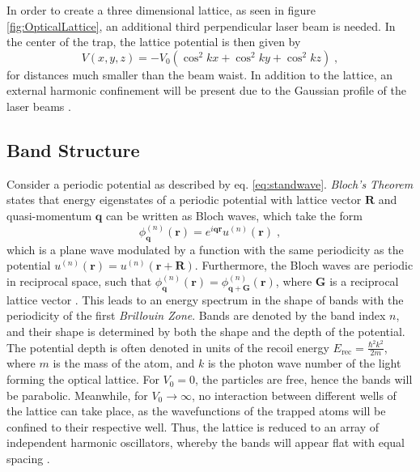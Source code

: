 In order to create a three dimensional lattice, as seen in figure \ref{fig:OpticalLattice}, an additional third perpendicular laser beam is needed. In the center of the trap, the lattice potential is then given by
\begin{equation}
	V(x,y,z) = - V_0 \left( \cos^2{k x } + \cos^2{k y } + \cos^2{k z } \right) \; , \label{eq:3Dlattice}
\end{equation}
for distances much smaller than the beam waist. In addition to the lattice, an external harmonic confinement will be present due to the Gaussian profile of the laser beams \cite{manybodyBloch}.

\subsection{Band Structure}
Consider a periodic potential as described by eq. \eqref{eq:standwave}. \textit{Bloch's Theorem} states that energy eigenstates of a periodic potential with lattice vector $\boldsymbol{R}$ and quasi-momentum $\boldsymbol{q}$ can be written as Bloch waves, which take the form
\begin{equation}
	\phi_{\boldsymbol{q}}^{(n)}(\boldsymbol{r}) = e^{i \boldsymbol{q} \boldsymbol{r}} u^{(n)}(\boldsymbol{r}) \; ,
\end{equation}
which is a plane wave modulated by a function with the same periodicity as the potential $u^{(n)}(\boldsymbol{r}) = u^{(n)}(\boldsymbol{r} + \boldsymbol{R})$. Furthermore, the Bloch waves are periodic in reciprocal space, such that $\phi_{\boldsymbol{q}}^{(n)}(\boldsymbol{r}) = \phi_{\boldsymbol{q} + \boldsymbol{G}}^{(n)}(\boldsymbol{r})$, where $\boldsymbol{G}$ is a reciprocal lattice vector \cite{kittel}.
This leads to an energy spectrum in the shape of bands with the periodicity of the first \textit{Brillouin Zone}. Bands are denoted by the band index $n$, and their shape is determined by both the shape and the depth of the potential. The potential depth is often denoted in units of the recoil energy $E_{\mathrm{rec}} = \frac{\hbar ^2 k^2}{2 m}$, where $m$ is the mass of the atom, and $k$ is the photon wave number of the light forming the optical lattice. For $V_0 = 0$, the particles are free, hence the bands will be parabolic. Meanwhile, for $V_0 \rightarrow \infty$, no interaction between different wells of the lattice can take place, as the wavefunctions of the trapped atoms will be confined to their respective well. Thus, the lattice is reduced to an array of independent harmonic oscillators, whereby the bands will appear flat with equal spacing \cite{greiner}. 

